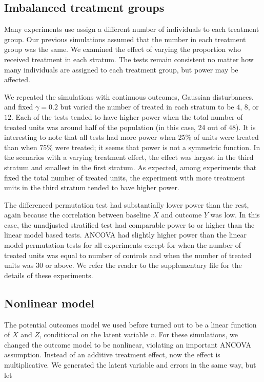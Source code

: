 \documentclass[12pt]{article}
\begin{document}
\subsection{Imbalanced treatment groups}
Many experiments use assign a different number of individuals to each treatment group.
Our previous simulations assumed that the number in each treatment group was the same.
We examined the effect of varying the proportion who received treatment in each stratum.
The tests remain consistent no matter how many individuals are assigned to each treatment group, 
but power may be affected.

We repeated the simulations with continuous outcomes, Gaussian disturbances, and fixed $\gamma=0.2$ but varied the number of treated in each stratum to be $4$, $8$, or $12$.
Each of the tests tended to have higher power when the total number of treated units was around half of the population (in this case, 24 out of 48).
It is interesting to note that all tests had more power when 25\% of units were treated than when 75\% were treated; it seems that power is not a symmetric function.
In the scenarios with a varying treatment effect, the  effect was largest in the third stratum and smallest in the first stratum.
As expected, among experiments that fixed the total number of treated units, the experiment with more treatment units in the third stratum tended to have higher power.

The differenced permutation test had substantially lower power than the rest,
again because the correlation between baseline $X$ and outcome $Y$ was low.
In this case, the unadjusted stratified test had comparable power to or higher than the linear model based tests.
ANCOVA had slightly higher power than the linear model permutation tests for all experiments except for when the number of treated units was equal to number of controls and when the number of treated units was 30 or above.
We refer the reader to the supplementary file for the details of these experiments.



\subsection{Nonlinear model}

The potential outcomes model we used before turned out to be a linear function of $X$ and $Z$, conditional on the latent variable $v$.
For these simulations, we changed the outcome model to be nonlinear, violating an important ANCOVA assumption.
Instead of an additive treatment effect, now the effect is multiplicative.
We generated the latent variable and errors in the same way, but let 
\end{document}
